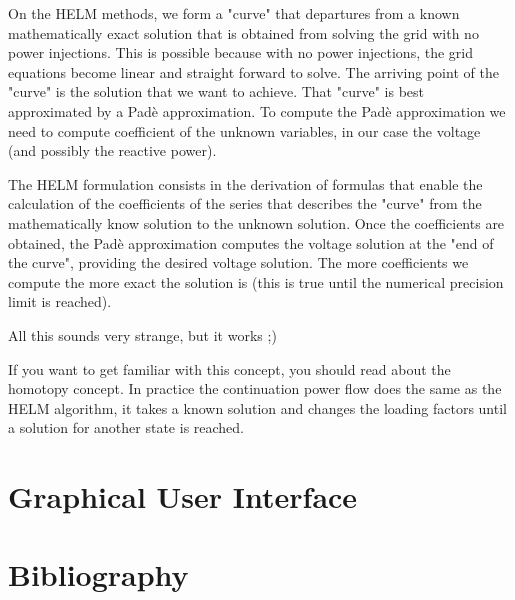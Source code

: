 \documentclass[11pt,fleqn]{book} %
\begin{document}
On the HELM methods, we form a "curve" that departures from a known mathematically exact solution that is obtained from solving the grid with no power injections. This is possible because with no power injections, the grid equations become linear and straight forward to solve. The arriving point of the "curve" is the solution that we want to achieve. That "curve" is best approximated by a Padè approximation. To compute the Padè approximation we need to compute coefficient of the unknown variables, in our case the voltage (and possibly the reactive power).

The HELM formulation consists in the derivation of formulas that enable the calculation of the coefficients of the series that describes the "curve" from the mathematically know solution to the unknown solution. Once the coefficients are obtained, the Padè approximation computes the voltage solution at the "end of the curve", providing the desired voltage solution. The more coefficients we compute the more exact the solution is (this is true until the numerical precision limit is reached).\newline 


All this sounds very strange, but it works ;)\newline 


If you want to get familiar with this concept, you should read about the homotopy concept. In practice the continuation power flow does the same as the HELM algorithm, it takes a known solution and changes the loading factors until a solution for another state is reached.


\chapter{Graphical User Interface}

\chapter*{Bibliography}


\end{document}
